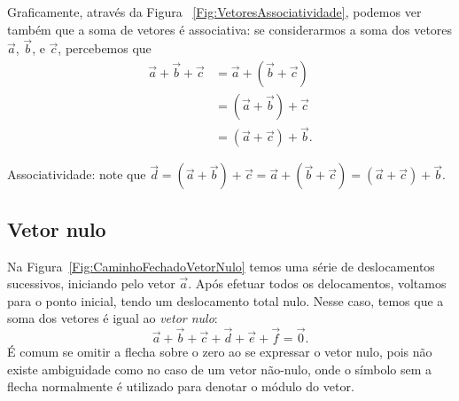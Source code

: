 Graficamente, através da Figura ~\ref{Fig:VetoresAssociatividade}, podemos ver também que a soma de vetores é associativa: se considerarmos a soma dos vetores $\vec{a}$, $\vec{b}$, e $\vec{c}$, percebemos que
\begin{align}
  \vec{a}+\vec{b} + \vec{c} &= \vec{a} + (\vec{b} + \vec{c}) \\
  &= (\vec{a}+\vec{b}) + \vec{c} \\
  &= (\vec{a}+\vec{c}) + \vec{b}.
\end{align}


\begin{marginfigure}
\centering
{}
\caption{Associatividade: note que $\vec{d} = (\vec{a} + \vec{b}) + \vec{c} = \vec{a} + (\vec{b} + \vec{c}) = (\vec{a} + \vec{c}) + \vec{b}$.\label{Fig:VetoresAssociatividade}}
\end{marginfigure}

\subsection{Vetor nulo}

Na Figura~\ref{Fig:CaminhoFechadoVetorNulo} temos uma série de deslocamentos sucessivos, iniciando pelo vetor $\vec{a}$. Após efetuar todos os delocamentos, voltamos para o ponto inicial, tendo um deslocamento total nulo. Nesse caso, temos que a soma dos vetores é igual ao \emph{vetor nulo}:
\begin{equation}
    \vec{a} + \vec{b} + \vec{c} + \vec{d} + \vec{e} + \vec{f} = \vec{0}.
\end{equation}
%
É comum se omitir a flecha sobre o zero ao se expressar o vetor nulo, pois não existe ambiguidade como no caso de um vetor não-nulo, onde o símbolo sem a flecha normalmente é utilizado para denotar o módulo do vetor.

